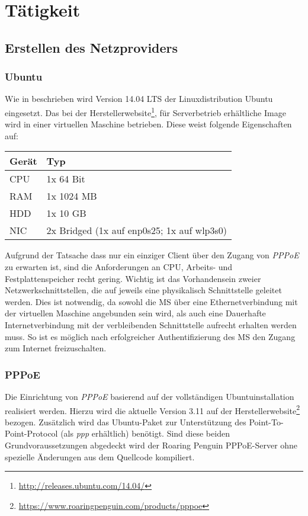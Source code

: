 \section{Tätigkeit}

\subsection{Erstellen des Netzproviders}

	\subsubsection{Ubuntu}
	Wie in  beschrieben wird Version 14.04 LTS
	der Linuxdistribution Ubuntu eingesetzt. Das bei der Herstellerwebsite\footnote{\url{http://releases.ubuntu.com/14.04/}},
	für Serverbetrieb erhältliche Image wird in einer virtuellen Maschine betrieben.
	Diese weist folgende Eigenschaften auf:

	\begin{tabularx}{\textwidth}{|l|X|}
    	\hline
      		\textbf{Gerät} & \textbf{Typ} \\
    	\hline
    	\hline
    		CPU & 1x 64 Bit \\
    	\hline
    	\hline
    		RAM & 1x 1024 MB \\
    	\hline
    	\hline
    		HDD & 1x 10 GB \\
    	\hline
    	\hline
    		NIC & 2x Bridged (1x auf enp0s25; 1x auf wlp3s0) \\
    	\hline
    	\end{tabularx}

    	Aufgrund der Tatsache dass nur ein einziger Client über den Zugang von \textit{PPPoE}
    	zu erwarten ist, sind die Anforderungen an CPU, Arbeits- und Festplattenspeicher
    	recht gering. Wichtig ist das Vorhandensein zweier Netzwerkschnittstellen, die
    	auf jeweils eine physikalisch Schnittstelle geleitet werden. Dies ist notwendig,
    	da sowohl die \ac{MS} über eine Ethernetverbindung mit der virtuellen Maschine angebunden sein wird,
    	als auch eine Dauerhafte Internetverbindung mit der verbleibenden Schnittstelle
    	aufrecht erhalten werden muss. So ist es möglich nach erfolgreicher Authentifizierung
    	des \ac{MS} den Zugang zum Internet freizuschalten.

    	\subsubsection{PPPoE}
    	Die Einrichtung von \textit{PPPoE} basierend auf der vollständigen Ubuntuinstallation realisiert werden. Hierzu wird die aktuelle
    	Version 3.11 auf der Herstellerwebsite\footnote{\url{https://www.roaringpenguin.com/products/pppoe}}
    	bezogen. Zusätzlich wird das Ubuntu-Paket zur Unterstützung
    	des Point-To-Point-Protocol (als \textit{ppp} erhältlich) benötigt. Sind diese beiden Grundvoraussetzungen
    	abgedeckt wird der Roaring Penguin PPPoE-Server ohne spezielle Änderungen aus dem Quellcode kompiliert.


